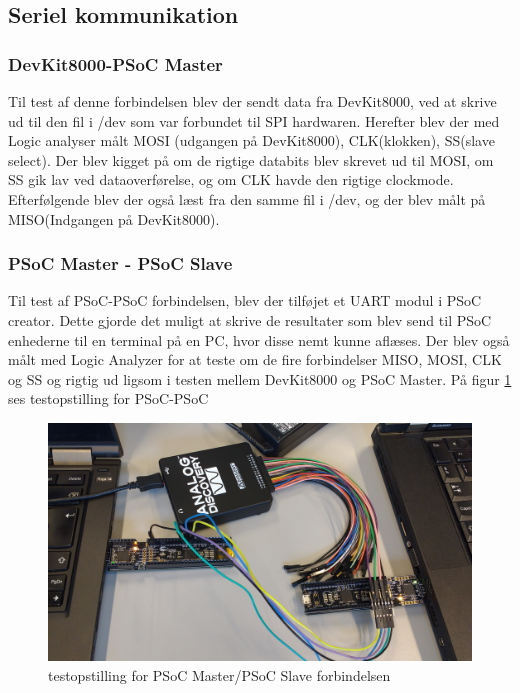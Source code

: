 \subsection{Seriel kommunikation}

\subsubsection{DevKit8000-PSoC Master}
Til test af denne forbindelsen blev der sendt data fra DevKit8000, ved at skrive ud til den fil i /dev som var forbundet til SPI hardwaren. Herefter blev der
med Logic analyser målt MOSI (udgangen på DevKit8000), CLK(klokken), SS(slave select). Der blev kigget på om de rigtige databits blev skrevet ud
til MOSI, om SS gik lav ved dataoverførelse, og om CLK havde den rigtige clockmode. Efterfølgende blev der også læst fra den samme fil i /dev, og der blev målt
på MISO(Indgangen på DevKit8000).

\subsubsection{PSoC Master - PSoC Slave}
Til test af PSoC-PSoC forbindelsen, blev der tilføjet et UART modul i PSoC creator. Dette gjorde det muligt at skrive de resultater som blev send til PSoC 
enhederne til en terminal på en PC, hvor disse nemt kunne aflæses. Der blev også målt med Logic Analyzer for at teste om de fire forbindelser MISO, MOSI, CLK 
og SS og rigtig ud ligsom i testen mellem DevKit8000 og PSoC Master. På figur \ref{testopstillen_PSoC_PSoC} ses testopstilling for PSoC-PSoC\\

\begin{figure}[H]
	\centerline{\includegraphics[scale=0.07]{tex/TeImRe/SPI/SPI_testAnalog}}
	\caption{testopstilling for PSoC Master/PSoC Slave forbindelsen}
	\label{testopstillen_PSoC_PSoC}
\end{figure}